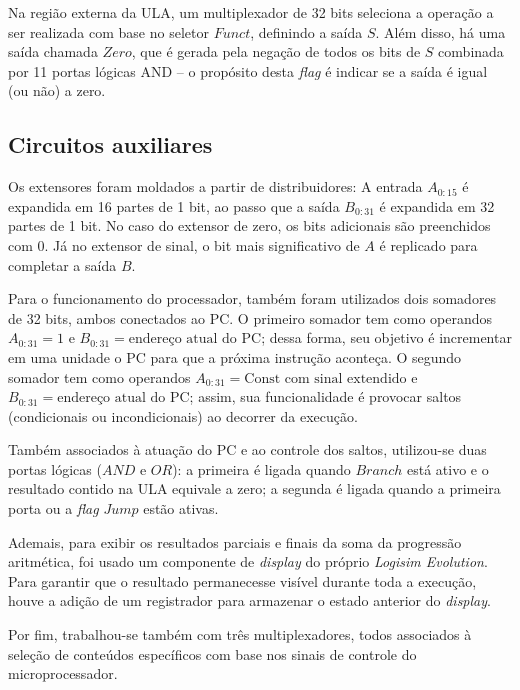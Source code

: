 \documentclass[twocolumn, 11pt]{article}
\begin{document}
Na região externa da ULA, um multiplexador de 32 bits seleciona a operação a ser realizada com base no seletor $Funct$, definindo a saída $S$. Além disso, há uma saída chamada $Zero$, que é gerada pela negação de todos os bits de $S$ combinada por 11 portas lógicas AND -- o propósito desta \textit{flag} é indicar se a saída é igual (ou não) a zero.

\subsection{Circuitos auxiliares}

Os extensores foram moldados a partir de distribuidores: A entrada $A_{0:15}$ é expandida em 16 partes de 1 bit, ao passo que a saída $B_{0:31}$ é expandida em 32 partes de 1 bit. No caso do extensor de zero, os bits adicionais são preenchidos com 0. Já no extensor de sinal, o bit mais significativo de $A$ é replicado para completar a saída $B$.

Para o funcionamento do processador, também foram utilizados dois somadores de 32 bits, ambos conectados ao PC. O primeiro somador tem como operandos $A_{0:31} = 1$ e $B_{0:31} = \text{endereço atual do PC}$; dessa forma, seu objetivo é incrementar em uma unidade o PC para que a próxima instrução aconteça. O segundo somador tem como operandos $A_{0:31} = \text{Const com sinal extendido}$ e $B_{0:31} = \text{endereço atual do PC}$; assim, sua funcionalidade é provocar saltos (condicionais ou incondicionais) ao decorrer da execução.

Também associados à atuação do PC e ao controle dos saltos, utilizou-se duas portas lógicas ($AND$ e $OR$): a primeira é ligada quando $Branch$ está ativo e o resultado contido na ULA equivale a zero; a segunda é ligada quando a primeira porta ou a \textit{flag} $Jump$ estão ativas.

Ademais, para exibir os resultados parciais e finais da soma da progressão aritmética, foi usado um componente de \textit{display} do próprio \textit{Logisim Evolution}. Para garantir que o resultado permanecesse visível durante toda a execução, houve a adição de um registrador para armazenar o estado anterior do \textit{display}.

Por fim, trabalhou-se também com três multiplexadores, todos associados à seleção de conteúdos específicos com base nos sinais de controle do microprocessador.
\end{document}

